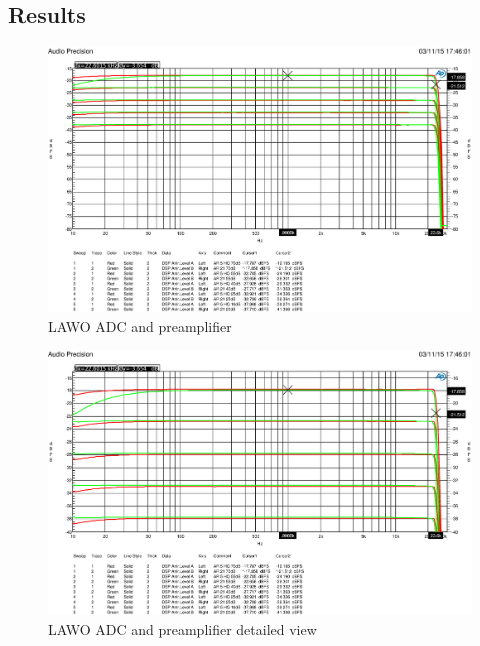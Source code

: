 \documentclass[11pt]{report}
\begin{document}
	\subsection{Results}
\begin{figure}[htbp]
\begin{center}
\includegraphics[width=14cm,keepaspectratio=true]{LAWOVorverstaerker5u21dB}
\caption{LAWO ADC and preamplifier}
\label{Abb.:1}
\end{center}
\end{figure}

\begin{figure}[htbp]
\begin{center}
\includegraphics[width=14cm,keepaspectratio=true]{LAWOVorverstaerker5u21dBVergleichszoom}
\caption{LAWO ADC and preamplifier detailed view}
\label{Abb.:1}
\end{center}
\end{figure}
\end{document}

